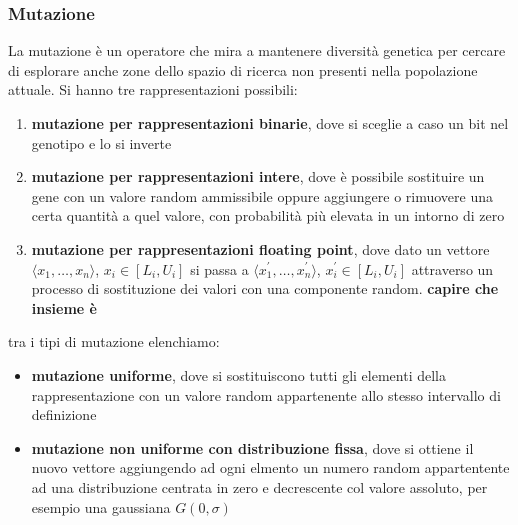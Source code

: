 \documentclass[a4paper,12pt, oneside]{book}
\begin{document}
\subsubsection{Mutazione}
La mutazione è un operatore che mira a mantenere diversità genetica
per cercare di esplorare anche zone dello spazio di ricerca non
presenti nella popolazione attuale. Si hanno tre rappresentazioni
possibili:
\begin{enumerate}
  \item \textbf{mutazione per rappresentazioni binarie}, dove si
  sceglie a caso un bit nel genotipo e lo si inverte
  \item \textbf{mutazione per rappresentazioni intere}, dove è
  possibile sostituire un gene con un valore random ammissibile oppure
  aggiungere o rimuovere una certa quantità a quel valore, con
  probabilità più elevata in un intorno di zero
  \item \textbf{mutazione per rappresentazioni floating point}, dove
  dato un vettore $\langle x_1,\ldots,x_n\rangle$, $x_i\in[L_i,U_i]$
  si passa a $\langle x^{'}_1,\ldots,x^{'}_n\rangle$,
  $x^{'}_i\in[L_i,U_i]$ attraverso un processo di sostituzione dei
  valori con una componente random. \textbf{capire che insieme è}
\end{enumerate}
tra i tipi di mutazione elenchiamo:
\begin{itemize}
  \item \textbf{mutazione uniforme}, dove si sostituiscono tutti gli
  elementi della rappresentazione con un valore random appartenente
  allo stesso intervallo di definizione
  \item \textbf{mutazione non uniforme con distribuzione fissa}, dove
  si ottiene il nuovo vettore aggiungendo ad ogni elmento un numero
  random appartentente ad una distribuzione centrata in zero e
  decrescente col valore assoluto, per esempio una gaussiana
  $G(0,\sigma)$ 
\end{itemize}
\end{document}
